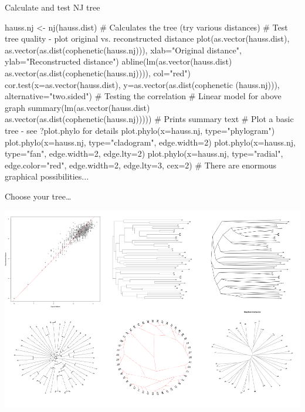 \documentclass[compress, ucs, xelatex, 11pt, xcolor=svgnames,
	hyperref={
		bookmarks=true,
		unicode=true,
		colorlinks=true,
		pdftitle={Molecular data in R},
		plainpages=false,
		pdfauthor={Vojtech Zeisek},
		pdfsubject={Course about phylogeny and evolution in R},
		pdfcreator={XeLaTeX},
		pdfkeywords={R, evolution, phylogeny, molecular data},
		linkcolor=Tomato,
		anchorcolor=SaddleBrown,
		citecolor=Goldenrod,
		filecolor=DarkMagenta,
		menucolor=Sienna,
		urlcolor=DarkTurquoise,
		pdftex},
	url={hyphens, lowtilde} %
	]{beamer}
\begin{document}
\begin{frame}[fragile]{Calculate and test NJ tree}
	\label{NJ}
	\begin{spluscode}
    hauss.nj <- nj(hauss.dist) # Calculates the tree (try various distances)
    # Test tree quality - plot original vs. reconstructed distance
    plot(as.vector(hauss.dist), as.vector(as.dist(cophenetic(hauss.nj))),
      xlab="Original distance", ylab="Reconstructed distance")
    abline(lm(as.vector(hauss.dist) ~
      as.vector(as.dist(cophenetic(hauss.nj)))), col="red")
    cor.test(x=as.vector(hauss.dist), y=as.vector(as.dist(cophenetic
      (hauss.nj))), alternative="two.sided") # Testing the correlation
    # Linear model for above graph
    summary(lm(as.vector(hauss.dist) ~
      as.vector(as.dist(cophenetic(hauss.nj))))) # Prints summary text
    # Plot a basic tree - see ?plot.phylo for details
    plot.phylo(x=hauss.nj, type="phylogram")
    plot.phylo(x=hauss.nj, type="cladogram", edge.width=2)
    plot.phylo(x=hauss.nj, type="fan", edge.width=2, edge.lty=2)
    plot.phylo(x=hauss.nj, type="radial", edge.color="red",
      edge.width=2, edge.lty=3, cex=2)
    # There are enormous graphical possibilities...
	\end{spluscode}
\end{frame}

\begin{frame}{Choose your tree\ldots}
	\begin{center}
		\includegraphics[width=\textwidth-1.5cm]{nj1.png}
	\end{center}
\end{frame}
\end{document}
